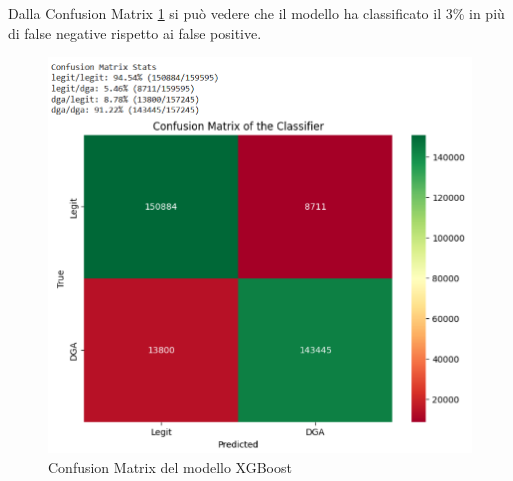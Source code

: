 \documentclass[12pt,a4paper,openright,twoside]{book}
\begin{document}
Dalla Confusion Matrix \ref{fig:XGBoost confusion matrix} si può vedere che il modello ha classificato
il 3\% in più di false negative rispetto ai false positive.
\begin{figure}[H]
    \centering
    \includegraphics[width=.8\linewidth]{figures/XGBoost_conf_matr.png}
    \caption{Confusion Matrix del modello XGBoost}
    \label{fig:XGBoost confusion matrix}
\end{figure}
\end{document}
